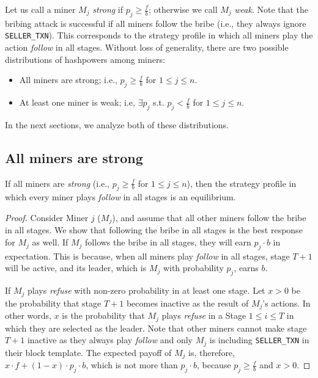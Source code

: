 \documentclass[runningheads]{llncs}
\newcommand{\sellertxn}{\texttt{SELLER\_TXN}}
\newcommand{\refuse}{\emph{refuse}}
\newcommand{\follow}{\emph{follow}}
\newcommand{\strong}{\emph{strong}}
\newcommand{\weak}{\emph{weak}}
\begin{document}
Let us call a miner $M_j$ \strong{} if $p_j\geq \frac{f}{b}$; otherwise we call $M_j$ \weak{}. Note that the bribing attack is successful if all miners follow the bribe  (i.e., they always ignore \sellertxn{}). This corresponds to the strategy profile in which all miners play the action \follow{} in all stages. Without loss of generality, there are two possible distributions of hashpowers among miners:

\begin{itemize}
    \item All miners are strong; i.e., $p_j\geq \frac{f}{b}$ for $1\leq j\leq n$.
    \item At least one miner is weak; i.e, $\exists p_j$ s.t. $p_j < \frac{f}{b}$ for $1\leq j\leq n$.
\end{itemize}

In the next sections, we analyze both of these distributions.

\subsection{All miners are strong} \label{ss:all_miners_strong}

\begin{lemma}
\label{lem:strong}
  If all miners are \strong{} (i.e., $p_j\geq \frac{f}{b}$ for $1\leq j\leq n$), then the strategy profile in which every miner plays \follow{} in all stages is an equilibrium.
\end{lemma}
\begin{proof}
    Consider Miner $j$ ($M_j$), and assume that all other miners follow the bribe in all stages. We show that following the bribe in all stages is the best response for $M_j$ as well. If $M_j$ follows the bribe in all stages, they will earn $p_j\cdot b$ in expectation. This is because, when all miners play \follow{} in all stages, stage $T+1$ will be active, and its leader, which is $M_j$ with probability $p_j$, earns $b$. 
    
    If $M_j$ plays \refuse{} with non-zero probability in at least one stage. Let $x>0$ be the probability that stage $T+1$ becomes inactive as the result of $M_j$'s actions. In other words, $x$ is the probability that $M_j$ plays \refuse{} in a Stage $1\leq i \leq T$ in which they are selected as the leader. Note that other miners cannot make stage $T+1$ inactive as they always play \follow{} and only $M_j$ is including \sellertxn{} in their block template. The expected payoff of $M_j$ is, therefore, $x\cdot f+(1-x)\cdot p_j\cdot b$, which is not more than $p_j\cdot b$, because $p_j \geq \frac{f}{b}$ and $x>0$. 
\end{proof}
\end{document}
